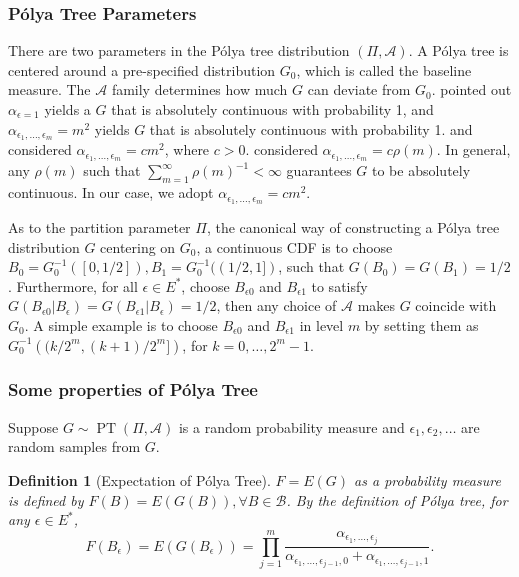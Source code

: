 \documentclass[12pt]{article}
\newtheorem{deff}[thm]{Definition}
\newcommand{\polya}{P\'{o}lya}
\DeclareMathOperator{\pt}{PT}
\begin{document}
\subsubsection{\polya{} Tree Parameters}
There are two parameters in the \polya{} tree distribution $(\Pi,
\mathcal{A})$. A \polya{} tree is centered around a
  pre-specified distribution $G_0$, which is called the baseline
  measure. The $\mathcal{A}$ family determines how much $G$ can
deviate from $G_0$. \citet{ferguson1974} pointed out $\alpha_{\epsilon = 1}
$ yields a $G$ that is absolutely continuous with probability 1, and
$\alpha_{\epsilon_1, \ldots, \epsilon_m} = m^2$ yields $G$ that is
absolutely continuous with probability 1. \citet{walker1999} and
\citet{paddock1999} considered $\alpha_{\epsilon_1, \ldots,
  \epsilon_m} = cm^2$, where $c > 0$. \citet{berger2001} considered
$\alpha_{\epsilon_1, \ldots, \epsilon_m} = c \rho(m)$. In general, any
$\rho(m) $ such that $\sum_{m=1}^{\infty} \rho(m)^{-1} < \infty$
guarantees $G$ to be absolutely continuous. In our case, we adopt
$\alpha_{\epsilon_1, \ldots, \epsilon_m} = cm^2$.

As to the partition parameter $\Pi$, the canonical way of constructing
a \polya{} tree distribution $G$ centering on $G_0$, a continuous CDF
is to choose $B_0 = G^{-1}_0 ([0, 1/2]), B_1 = G^{-1}_0 ((1/2,1])$,
such that $G(B_0) = G(B_1)= 1/2$. Furthermore, for all $\epsilon \in
E^{*}$, choose $B_{\epsilon 0 }$ and $B_{\epsilon 1}$ to satisfy
$G(B_{\epsilon 0 } |B_{\epsilon} ) = G(B_{\epsilon 1} | B_{\epsilon})
= 1/2 $, then any choice of $\mathcal{A} $ makes $G$ coincide with
$G_0$. A simple example is to choose $B_{\epsilon 0} $ and
$B_{\epsilon 1}$ in level $m$ by setting them as $G^{-1}_0 \left(
  (k/2^m, (k+1)/2^m] \right)$, for $k=0, \ldots, 2^m-1$.

\subsubsection{Some properties of \polya{} Tree}
Suppose $G \sim \pt (\Pi, \mathcal{A})$ is a random probability
measure and $\epsilon_1, \epsilon_2, \ldots$ are random samples from
$G$.

\begin{deff}[Expectation of \polya{} Tree]
  $F= E(G)$ as a probability measure is defined by $F(B) = E(G(B)),
  \forall B \in \mathcal{B}$. By the definition of \polya{} tree, for
  any $\epsilon \in E^{*}$,
  \begin{displaymath}
    F(B_{\epsilon})  = E(G(B_{\epsilon})) = \prod_{j=1}^m
    \frac{\alpha_{\epsilon_1, \ldots, \epsilon_j}}{\alpha_{\epsilon_1,
        \ldots, \epsilon_{j-1},0} + \alpha_{\epsilon_1, \ldots, \epsilon_{j-1},1}}.
  \end{displaymath}
\end{deff}
\end{document}
